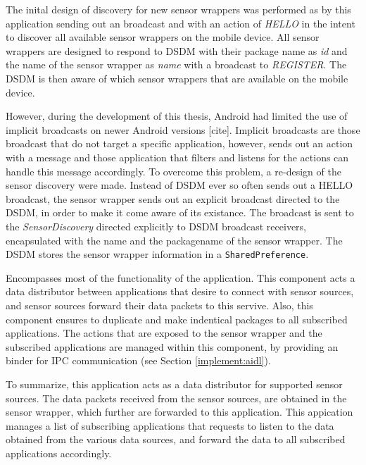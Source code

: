 \begin{description}[font=\normalfont\itshape]
    \item[Sensor Discovery] The inital design of discovery for new sensor wrappers was performed as by this application sending out an broadcast and with an action of \textit{HELLO} in the intent to discover all available sensor wrappers on the mobile device. All sensor wrappers are designed to respond to DSDM with their package name as \textit{id} and the name of the sensor wrapper as \textit{name} with a broadcast to \textit{REGISTER}. The DSDM is then aware of which sensor wrappers that are available on the mobile device. 
    
    However, during the development of this thesis, Android had limited the use of implicit broadcasts on newer Android versions [cite]. Implicit broadcasts are those broadcast that do not target a specific application, however, sends out an action with a message and those application that filters and listens for the actions can handle this message accordingly. To overcome this problem, a re-design of the sensor discovery were made. Instead of DSDM ever so often sends out a HELLO broadcast, the sensor wrapper sends out an explicit broadcast directed to the DSDM, in order to make it come aware of its existance. The broadcast is sent to the \textit{SensorDiscovery} directed explicitly to DSDM broadcast receivers, encapsulated with the name and the packagename of the sensor wrapper. The DSDM stores the sensor wrapper information in a \verb|SharedPreference|. 

    \item[DataStreamDispatchingService] Encompasses most of the functionality of the application. This component acts a data distributor between applications that desire to connect with sensor sources, and sensor sources forward their data packets to this servive. Also, this component ensures to duplicate and make indentical packages to all subscribed applications. The actions that are exposed to the sensor wrapper and the subscribed applications are managed within this component, by providing an binder for IPC communication (see Section \ref{implement:aidl}). 

\end{description}


To summarize, this application acts as a data distributor for supported sensor sources. The data packets received from the sensor sources, are obtained in the sensor wrapper, which further are forwarded to this application. This appication manages a list of subscribing applications that requests to listen to the data obtained from the various data sources, and forward the data to all subscribed applications accordingly. 


